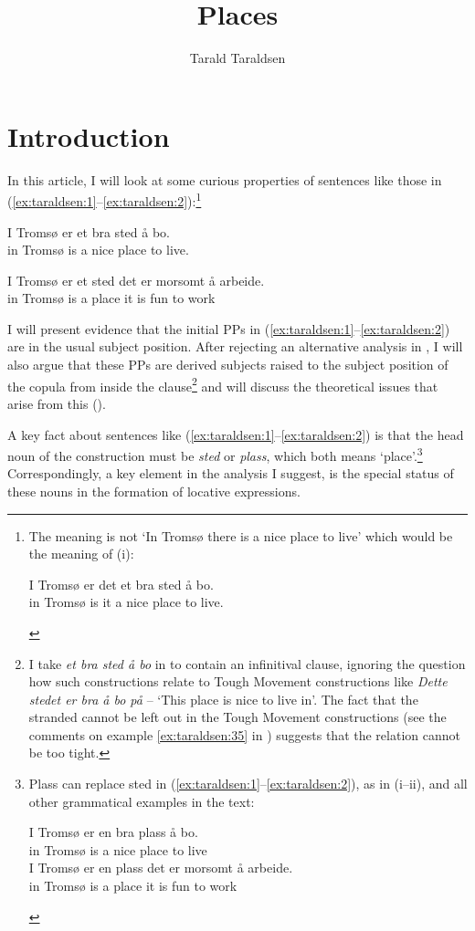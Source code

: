 \documentclass[output=paper]{LSP/langsci}
\author{Tarald Taraldsen\affiliation{University of Tromsø}}
\title{Places}
\begin{document}
\section{Introduction}\label{sec:taraldsen:1}
In this article, I will look at some curious properties of  sentences like those in (\ref{ex:taraldsen:1}--\ref{ex:taraldsen:2}):\footnote{The meaning is not `In Tromsø there is a nice place to live' which would be the meaning of (i):
\begin{xlisti}
	\label{ex:taraldsen:i}\gll I Tromsø er det et bra sted å bo.\\
        in Tromsø is it a nice place to live.\\
\end{xlisti}
}

\ea%
    \label{ex:taraldsen:1}
    \gll I Tromsø er et bra sted å bo.\\
       in Tromsø is a nice place to live. \\
    \z

\ea%
    \label{ex:taraldsen:2}
	\gll   I Tromsø er et sted det er morsomt å arbeide.\\
	      in Tromsø is a place it is fun          to work\\
\z

I will present evidence that the initial PPs in (\ref{ex:taraldsen:1}--\ref{ex:taraldsen:2}) are in the usual subject position. After rejecting an alternative analysis in , I will also argue that these PPs are derived subjects raised to the subject position of the copula from inside the  clause\footnote{I take \textit{et bra sted å bo} in  to contain an infinitival  clause, ignoring the question how such constructions relate to Tough Movement constructions like \textit{Dette stedet er bra å bo på} – ‘This place is nice to live in’. The fact that the stranded  cannot be left out in the Tough Movement constructions (see the comments on example \ref{ex:taraldsen:35} in ) suggests that the relation cannot be too tight.} and will discuss the theoretical issues that arise from this ().

A key fact about sentences like (\ref{ex:taraldsen:1}--\ref{ex:taraldsen:2}) is that the head noun of the  construction must be \textit{sted} or \textit{plass}, which both means `place'.\footnote{%
Plass can replace sted in (\ref{ex:taraldsen:1}--\ref{ex:taraldsen:2}), as in (i--ii), and all other grammatical examples in the text:
\begin{xlisti}[(ii)]  
	\label{ex:taraldsen:3i}
	\gll I Tromsø er en bra plass å bo.\\
	    in Tromsø is a nice place to live\\
	\label{ex:taraldsen:3ii}
	\gll I Tromsø er en plass det er morsomt å arbeide.\\
	     in Tromsø is a place it is fun to work\\
\end{xlisti}
} Correspondingly, a key element in the analysis I suggest, is the special status of these nouns in the formation of locative expressions.
\end{document}

